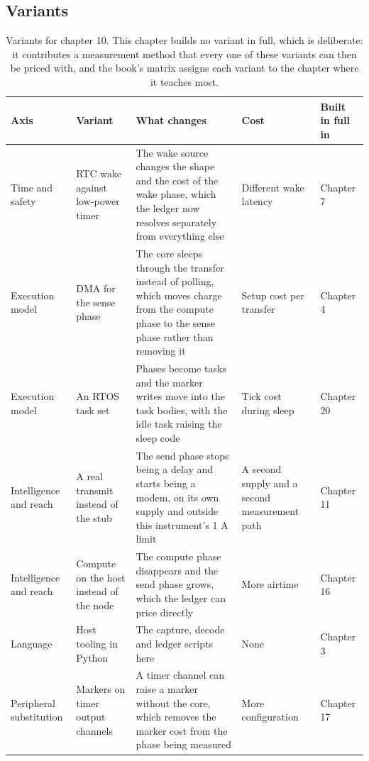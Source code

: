 \subsection*{Variants}

\begin{table}[H]\centering\small
\begin{tabular}{p{24mm}p{26mm}p{44mm}p{22mm}p{20mm}}
\toprule
Axis & Variant & What changes & Cost & Built in full in \\
\midrule
Time and safety & RTC wake against low-power timer & The wake source changes the shape and the cost of the wake phase, which the ledger now resolves separately from everything else & Different wake latency & Chapter 7 \\
Execution model & DMA for the sense phase & The core sleeps through the transfer instead of polling, which moves charge from the compute phase to the sense phase rather than removing it & Setup cost per transfer & Chapter 4 \\
Execution model & An RTOS task set & Phases become tasks and the marker writes move into the task bodies, with the idle task raising the sleep code & Tick cost during sleep & Chapter 20 \\
Intelligence and reach & A real transmit instead of the stub & The send phase stops being a delay and starts being a modem, on its own supply and outside this instrument's 1 A limit & A second supply and a second measurement path & Chapter 11 \\
Intelligence and reach & Compute on the host instead of the node & The compute phase disappears and the send phase grows, which the ledger can price directly & More airtime & Chapter 16 \\
Language & Host tooling in Python & The capture, decode and ledger scripts here & None & Chapter 3 \\
Peripheral substitution & Markers on timer output channels & A timer channel can raise a marker without the core, which removes the marker cost from the phase being measured & More configuration & Chapter 17 \\
\bottomrule
\end{tabular}
\caption{Variants for chapter 10. This chapter builds no variant in full, which is deliberate: it contributes a measurement method that every one of these variants can then be priced with, and the book's matrix assigns each variant to the chapter where it teaches most.}
\end{table}

